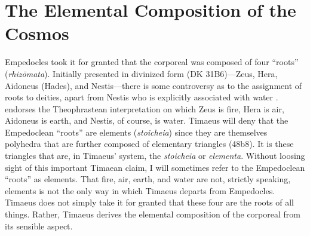 

\section{The Elemental Composition of the Cosmos} %
\label{sec:the_elemental_composition_of_the_corporeal}

Empedocles took it for granted that the corporeal was composed of four ``roots'' (\emph{rhi\-zō\-ma\-ta}). Initially presented in divinized form (DK 31B6)---Zeus, Hera, Aidoneus (Hades), and Nestis---there is some controversy as to the assignment of roots to deities, apart from Nestis who is explicitly associated with water \citep[165--6]{Wright:1981zr}. \citet[165]{Wright:1981zr} endorses the Theophrastean interpretation on which Zeus is fire, Hera is air, Aidon\-eus is earth, and Nestis, of course, is water. Timaeus will deny that the Empedoclean ``roots'' are elements (\emph{stoicheia}) since they are themselves polyhedra that are further composed of elementary triangles (48b8). It is these triangles that are, in Timaeus' system, the \emph{stoicheia} or \emph{elementa}. Without loosing sight of this important Timaean claim, I will sometimes refer to the Empedoclean ``roots'' as elements. That fire, air, earth, and water are not, strictly speaking, elements is not the only way in which Timaeus departs from Empedocles. Timaeus does not simply take it for granted that these four are the roots of all things. Rather, Timaeus derives the elemental composition of the corporeal from its sensible aspect.

